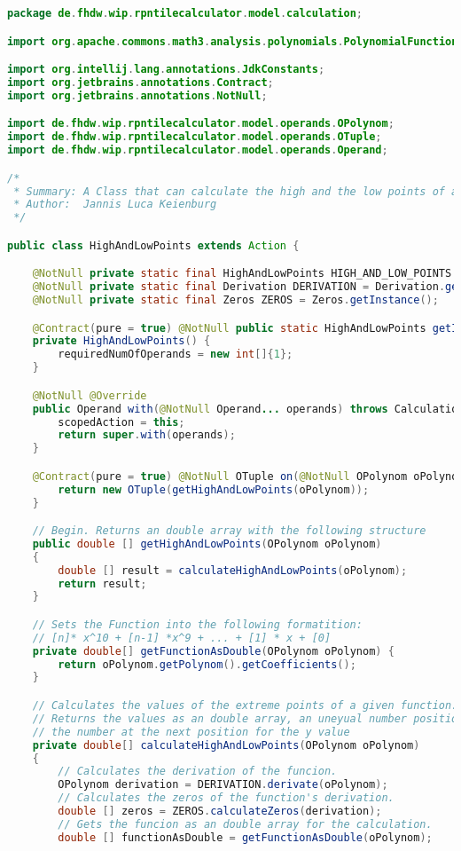 \begin{lstlisting}[caption=HighAndLowPoints (Keienburg),label=list:HighAndLowPoints,language=Java]
package de.fhdw.wip.rpntilecalculator.model.calculation;

import org.apache.commons.math3.analysis.polynomials.PolynomialFunction;

import org.intellij.lang.annotations.JdkConstants;
import org.jetbrains.annotations.Contract;
import org.jetbrains.annotations.NotNull;

import de.fhdw.wip.rpntilecalculator.model.operands.OPolynom;
import de.fhdw.wip.rpntilecalculator.model.operands.OTuple;
import de.fhdw.wip.rpntilecalculator.model.operands.Operand;

/*
 * Summary: A Class that can calculate the high and the low points of a function( up to third grade)
 * Author:  Jannis Luca Keienburg
 */

public class HighAndLowPoints extends Action {

    @NotNull private static final HighAndLowPoints HIGH_AND_LOW_POINTS = new HighAndLowPoints();
    @NotNull private static final Derivation DERIVATION = Derivation.getInstance();
    @NotNull private static final Zeros ZEROS = Zeros.getInstance();

    @Contract(pure = true) @NotNull public static HighAndLowPoints getInstance() { return HIGH_AND_LOW_POINTS; }
    private HighAndLowPoints() {
        requiredNumOfOperands = new int[]{1};
    }

    @NotNull @Override
    public Operand with(@NotNull Operand... operands) throws CalculationException {
        scopedAction = this;
        return super.with(operands);
    }

    @Contract(pure = true) @NotNull OTuple on(@NotNull OPolynom oPolynom) {
        return new OTuple(getHighAndLowPoints(oPolynom));
    }

    // Begin. Returns an double array with the following structure
    public double [] getHighAndLowPoints(OPolynom oPolynom)
    {
        double [] result = calculateHighAndLowPoints(oPolynom);
        return result;
    }

    // Sets the Function into the following formatition:
    // [n]* x^10 + [n-1] *x^9 + ... + [1] * x + [0]
    private double[] getFunctionAsDouble(OPolynom oPolynom) {
        return oPolynom.getPolynom().getCoefficients();
    }

    // Calculates the values of the extreme points of a given function.
    // Returns the values as an double array, an uneyual number position stands for the x value,
    // the number at the next position for the y value
    private double[] calculateHighAndLowPoints(OPolynom oPolynom)
    {
        // Calculates the derivation of the funcion.
        OPolynom derivation = DERIVATION.derivate(oPolynom);
        // Calculates the zeros of the function's derivation.
        double [] zeros = ZEROS.calculateZeros(derivation);
        // Gets the funcion as an double array for the calculation.
        double [] functionAsDouble = getFunctionAsDouble(oPolynom);


\end{lstlisting}
